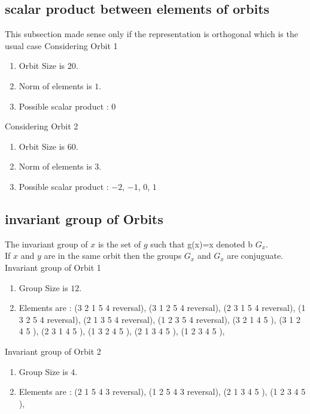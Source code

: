 \documentclass[12pt]{article}
\begin{document}
\subsection{scalar product between elements of orbits}
\noindent This subsection made sense only if the representation is orthogonal which is the usual case
Considering Orbit 1
\begin{enumerate}
\item Orbit Size is $20$.
\item Norm of elements is $1$.
\item Possible scalar product : $0$
\end{enumerate}
Considering Orbit 2
\begin{enumerate}
\item Orbit Size is $60$.
\item Norm of elements is $3$.
\item Possible scalar product : $-2$, $-1$, $0$, $1$
\end{enumerate}
\subsection{invariant group of Orbits}
\noindent The invariant group of $x$ is the set of $g$ such that g(x)=x denoted b $G_x$.\\
If $x$ and $y$ are in the same orbit then the groups $G_x$ and  $G_x$ are conjuguate.\\
Invariant group of Orbit 1
\begin{enumerate}
\item Group Size is $12$.
\item Elements are : (3 2 1 5 4   reversal), (3 1 2 5 4   reversal), (2 3 1 5 4   reversal), (1 3 2 5 4   reversal), (2 1 3 5 4   reversal), (1 2 3 5 4   reversal), (3 2 1 4 5  ), (3 1 2 4 5  ), (2 3 1 4 5  ), (1 3 2 4 5  ), (2 1 3 4 5  ), (1 2 3 4 5  ), 
\end{enumerate}
Invariant group of Orbit 2
\begin{enumerate}
\item Group Size is $4$.
\item Elements are : (2 1 5 4 3   reversal), (1 2 5 4 3   reversal), (2 1 3 4 5  ), (1 2 3 4 5  ), 
\end{enumerate}
\end{document}
